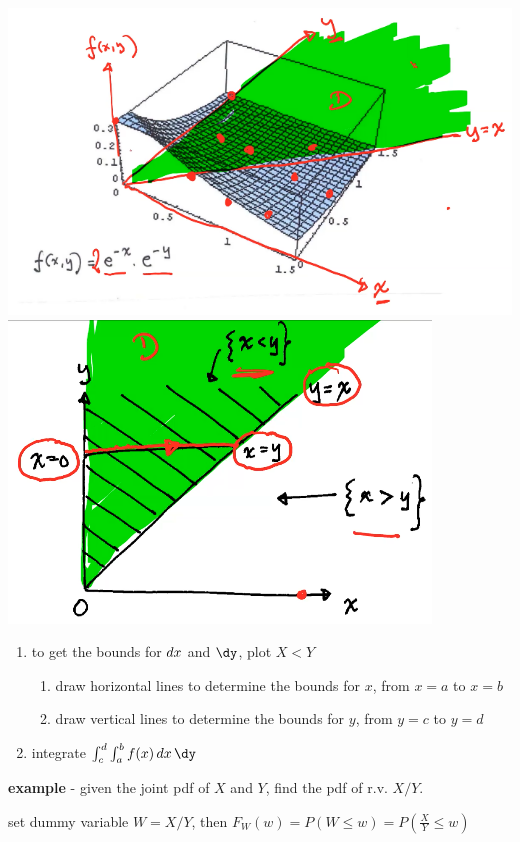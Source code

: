 \documentclass[10pt, landscape]{article}
\begin{document}
\begin{multicols*}{3}
  \includegraphics[width=0.55\linewidth]{st2131-double-integral-eg-1.png} 
  \includegraphics[width=0.4\linewidth]{st2131-double-integral-eg-2.png} 

  \begin{enumerate}
    \item to get the bounds for $\mathop{dx}$ and $\dy$, plot $X<Y$ 
      \begin{enumerate}
        \item draw horizontal lines to determine the bounds for $x$, from $x=a$ to $x=b$
        \item draw vertical lines to determine the bounds for $y$, from $y=c$ to $y=d$
      \end{enumerate}
    \item integrate $\int^d_c \int^b_a f(x) \dx \dy$
  \end{enumerate}

  \begin{minipage}[c]{0.55\linewidth}
    \textbf{example} - given the joint pdf of $X$ and $Y$, find the pdf of r.v. $X/Y$.

    \begin{niceproof}[ans]
      set dummy variable $W = X/Y$, 
      then $F_W(w) = P(W \leq w) = P(\frac{X}{Y} \leq w)$


\end{niceproof}
\end{minipage}
\end{multicols*}
\end{document}
